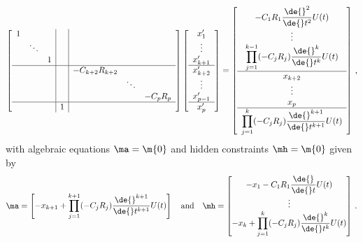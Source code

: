 \begin{equation*}
  \left[\begin{array}{ccc|c|ccc}
    1 &        &   & \\
      & \ddots &   & \\
      &        & 1 & \\ \hline
      &        &   & & -C_{k+2} R_{k+2} \\
      &        &   & & & \ddots \\
      &        &   & & & & -C_{p} R_{p} \\ \hline
      &        &   & 1 \\
  \end{array}\right]
  \left[\begin{array}{c}
    x_1^{\prime} \\ \vdots \\ x_{k+1}^{\prime} \\ \hline
    x_{k+2}^{\prime} \\ \vdots \\ x_{p-1}^{\prime} \\ \hline
    x_p^{\prime}
  \end{array}\right] = \left[\begin{array}{c}
    -C_1R_1 \dfrac{\de{}^2}{\de{}t^2}U(t) \\
    \vdots \\
    \displaystyle\prod_{j=1}^{k-1} (-C_j R_j) \dfrac{\de{}^k}{\de{}t^k}U(t) \\ \hline
    x_{k+2} \\ \vdots \\ x_p \\ \hline
    \displaystyle\prod_{j=1}^{k} (-C_j R_j) \dfrac{\de{}^{k+1}}{\de{}t^{k+1}}U(t)
  \end{array}\right] \, \text{,}
\end{equation*}
%
with algebraic equations $\ma = \m{0}$ and hidden constraints $\mh = \m{0}$ given by
%
\begin{equation*}
  \ma = \begin{bmatrix}
    -x_{k+1} + \displaystyle\prod_{j=1}^{k+1} (-C_j R_j) \dfrac{\de{}^{k+1}}{\de{}t^{k+1}}U(t)
  \end{bmatrix}
  \quad \text{and} \quad
  \mh = \begin{bmatrix}
    -x_{1} - C_1R_1 \dfrac{\de{}}{\de{}t}U(t) \\
    \vdots \\
    -x_k + \displaystyle\prod_{j=1}^{k} (-C_j R_j) \dfrac{\de{}^{k}}{\de{}t^{k}}U(t)
  \end{bmatrix} \, \text{.}
\end{equation*}
